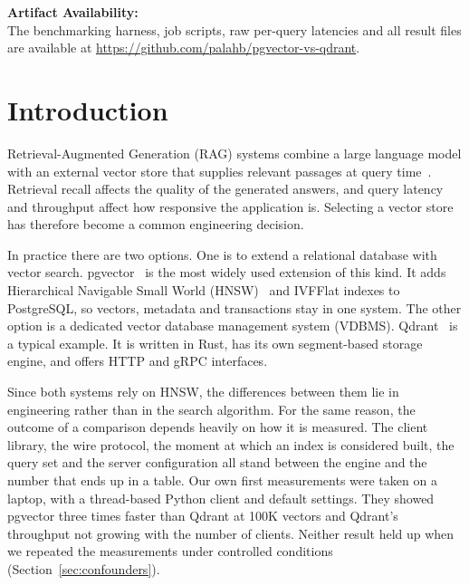 \documentclass[sigconf, nonacm]{acmart}
\begin{document}

\maketitle

\begingroup\small\noindent\raggedright\textbf{Artifact Availability:}\\
The benchmarking harness, job scripts, raw per-query latencies and all result files
are available at \url{https://github.com/palahb/pgvector-vs-qdrant}.
\endgroup

\section{Introduction}

Retrieval-Augmented Generation (RAG) systems combine a large language model with an
external vector store that supplies relevant passages at query time~\cite{pan2024survey}.
Retrieval recall affects the quality of the generated answers, and query latency and
throughput affect how responsive the application is. Selecting a vector store has
therefore become a common engineering decision.

In practice there are two options. One is to extend a relational database with vector
search. pgvector~\cite{pgvector} is the most widely used extension of this kind. It
adds Hierarchical Navigable Small World (HNSW)~\cite{malkov2018} and IVFFlat indexes to
PostgreSQL, so vectors, metadata and transactions stay in one system. The other option
is a dedicated vector database management system (VDBMS). Qdrant~\cite{qdrant} is a
typical example. It is written in Rust, has its own segment-based storage engine, and
offers HTTP and gRPC interfaces.

Since both systems rely on HNSW, the differences between them lie in engineering
rather than in the search algorithm. For the same reason, the outcome of a comparison
depends heavily on how it is measured. The client library, the wire protocol, the
moment at which an index is considered built, the query set and the server
configuration all stand between the engine and the number that ends up in a table. Our
own first measurements were taken on a laptop, with a thread-based Python client and
default settings. They showed pgvector three times faster than Qdrant at 100K vectors
and Qdrant's throughput not growing with the number of clients. Neither result held up
when we repeated the measurements under controlled conditions
(Section~\ref{sec:confounders}).
\end{document}
